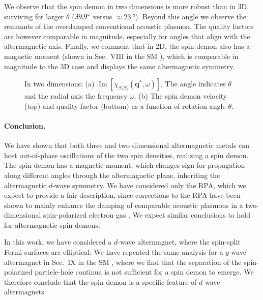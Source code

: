 \documentclass[aps,prl,reprint,twocolumns,superscriptaddress]{revtex4-2}
\DeclareMathOperator{\Imm}{Im}
\begin{document}
	
	We observe that the spin demon in two dimensions is more robust than in 3D, surviving for larger $\theta$ ($\SI{39.9}{\degree}$ versus $\approx\SI{23}{\degree}$). Beyond this angle we observe the remnants of the overdamped conventional acoustic plasmon. The quality factors are however comparable in magnitude, especially for angles that align with the altermagnetic axis. Finally, we comment that in 2D, the spin demon also has a magnetic moment (shown in Sec.~VIII in the SM \cite{Note1}), which is comparable in magnitude to the 3D case and displays the same altermagnetic symmetry.
	
	\begin{figure}
		\caption{In two dimensions: (a) $\Imm[\chi_{S_zS_z}(\bm q^*,\omega)]$, The angle indicates $\theta$ and the radial axis the frequency $\omega$. (b) The spin demon velocity (top) and quality factor (bottom) as a function of rotation angle  $\theta$. \label{fig:2D} }
	\end{figure}
	

	
	
	\paragraph{Conclusion. }We have shown that both three and two dimensional altermagnetic metals can host out-of-phase oscillations of the two spin densities, realizing a spin demon. 
	The spin demon has a magnetic moment, which changes sign for propagation along different angles through the altermagnetic plane, inheriting the altermagnetic $d$-wave symmetry.
	We have considered only the RPA, which we expect to provide a fair description, since corrections to the RPA have been shown to mainly enhance the damping of comparable acoustic plasmons in a two-dimensional spin-polarized electron gas \cite{kreilExcitationsSpinpolarizedTwodimensional2015}. We expect similar conclusions to hold for altermagnetic spin demons.
	
	
	In this work, we have considered a $d$-wave altermagnet, where the spin-split Fermi surfaces are elliptical. We have repeated the same analysis for a $g$-wave altermagnet in Sec.~IX in the SM \cite{Note1}, where we find that the separation of the spin-polarized particle-hole continua is not sufficient for a spin demon to emerge. We therefore conclude that the spin demon is a specific feature of $d$-wave altermagnets.
	
\end{document}
